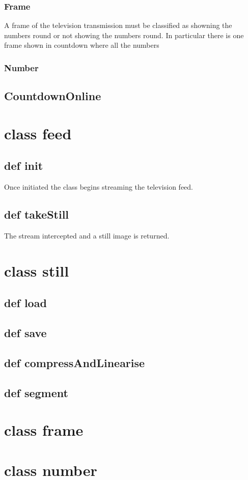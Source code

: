 \documentclass[paper=a4, fontsize=11pt]{scrartcl} %
\begin{document}
\subsubsection{Frame}

A frame of the television transmission must be classified as showning the numbers round 
or not showing the numbers round. In particular there is one frame shown in countdown
where all the numbers
\subsubsection{Number}



\subsection{CountdownOnline}

\section{class feed}

\subsection{def init}
Once initiated the class begins streaming the television feed.

\subsection{def takeStill}
The stream intercepted and a still image is returned.

\section{class still}

\subsection{def load}

\subsection{def save}

\subsection{def compressAndLinearise}

\subsection{def segment}

\section{class frame}

\section{class number}
\end{document}
